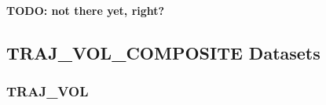 \documentclass[a4paper,11pt,pdftex,twoside]{scrartcl}
\renewcommand{\bf}{\normalfont \bfseries}
\begin{document}
{{{{\bf TODO: not there yet, right?}

%
%

\subsection{TRAJ\_VOL\_COMPOSITE Datasets}

\subsubsection{TRAJ\_VOL}
\label{subsec_traj_vol}

}}}
\end{document}
